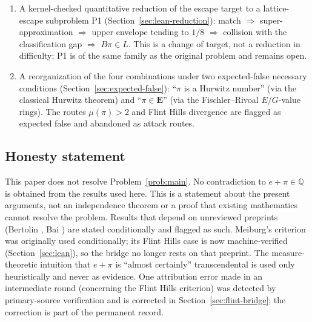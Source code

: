 \documentclass[11pt]{amsart}
\theoremstyle{definition}
\theoremstyle{remark}
\numberwithin{equation}{section}
\newcommand{\Q}{\mathbb{Q}}
\newcommand{\irr}{\mu}
\begin{document}
\begin{enumerate}
\item A kernel-checked quantitative reduction of the escape target to a lattice-escape subproblem P1 (Section~\ref{sec:lean-reduction}): match $\Rightarrow$ super-approximation $\Rightarrow$ upper envelope tending to $1/8$ $\Rightarrow$ collision with the classification gap $\Rightarrow$ $B\pi\in L$. This is a change of target, not a reduction in difficulty; P1 is of the same family as the original problem and remains open.
\item A reorganization of the four combinations under two expected-false necessary conditions (Section~\ref{sec:expected-false}): ``$\pi$ is a Hurwitz number'' (via the classical Hurwitz theorem) and ``$\pi\in\mathbf{E}$'' (via the Fischler--Rivoal $E/G$-value rings). The routes $\irr(\pi)>2$ and Flint Hills divergence are flagged as expected false and abandoned as attack routes.
\end{enumerate}

\subsection{Honesty statement} This paper does not resolve Problem~\ref{prob:main}. No contradiction to $e+\pi\in\Q$ is obtained from the results used here. This is a statement about the present arguments, not an independence theorem or a proof that existing mathematics cannot resolve the problem. Results that depend on unreviewed preprints (Bertolin \cite{Bertolin2026}, Bai \cite{Bai2026}) are stated conditionally and flagged as such. Meiburg's criterion \cite{Meiburg2022} was originally used conditionally; its Flint Hills case is now machine-verified (Section~\ref{sec:lean}), so the bridge no longer rests on that preprint. The measure-theoretic intuition that $e+\pi$ is ``almost certainly'' transcendental is used only heuristically and never as evidence. One attribution error made in an intermediate round (concerning the Flint Hills criterion) was detected by primary-source verification and is corrected in Section~\ref{sec:flint-bridge}; the correction is part of the permanent record.
\end{document}
